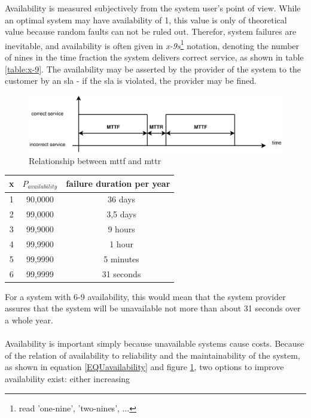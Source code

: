 Availability is measured subjectively from the system user's point of view.
While an optimal system may have availability of 1, this value is only of theoretical value because random faults can not be ruled out. Therefor,
system failures are inevitable, and availability is often given in \textit{x-9s}\footnote{read 'one-nine', 'two-nines', ...} notation, denoting the 
number of nines in the time fraction the system delivers correct service, as shown in table \ref{table:x-9}.
The availability may be asserted by the provider of the system to the customer by an
\gls{sla} - if the \gls{sla} is violated, the provider may be fined.
\begin{figure}
    \centering
    \includegraphics[width=1\textwidth]{figures/availability}
    \caption{Relationship between \gls{mttf} and \gls{mttr}}
    \label{fig:relmttfmttr}
\end{figure}
\begin{center}
\begin{tabular}{ c | c c  }
 \label{table:x-9}
  x & $P_{availability}$ & failure duration per year \\ \hline
  1 & 90,0000    & ~ 36 days \\
  2 & 99,0000    & ~ 3,5 days  \\
  3 & 99,9000    & ~ 9 hours \\
  4 & 99,9900    & ~ 1 hour \\
  5 & 99,9990    & ~ 5 minutes \\
  6 & 99,9999    & ~ 31 seconds \\ 
  
\end{tabular}
\end{center}
For a system with 6-9 availability, this would mean that the system provider assures that the system will be unavailable not more than about 31 seconds over a
whole year.
\\
\\
Availability is important simply because unavailable systems cause costs. Because of the relation of availability to reliability and the maintainability
of the system, as shown in equation \ref{EQUavailability} and figure \ref{fig:relmttfmttr}, two options to improve availability exist: either increasing

